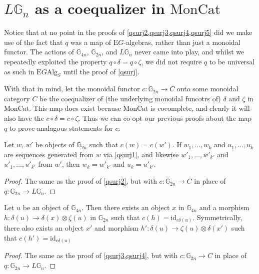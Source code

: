 \section{$L\mathbb{G}_n$ as a coequalizer in $\mathrm{MonCat}$}

Notice that at no point in the proofs of \cref{qsurj2,qsurj3,qsurj4,qsurj5} did we make use of the fact that $q$ was a map of $\mathrm{E}G$-algebras, rather than just a monoidal functor. The actions of $\mathbb{G}_{4n}$, $\mathbb{G}_{2n}$, and $L\mathbb{G}_n$ never came into play, and whilst we repeatedly exploited the property $q \circ \delta = q \circ \zeta$, we did not require $q$ to be universal as such in $\mathrm{E}G\mathrm{Alg}_S$ until the proof of \cref{qsurj}.

With that in mind, let the monoidal functor $c: \mathbb{G}_{2n} \to C$ onto some monoidal category $C$ be the coequalizer of (the underlying monoidal funcotrs of) $\delta$ and $\zeta$ in $\mathrm{MonCat}$. This map does exist because $\mathrm{MonCat}$ is cocomplete, and clearly it will also have the $c \circ \delta = c \circ \zeta$. Thus we can co-opt our previous proofs about the map $q$ to prove analagous statements for $c$.

\begin{prop} \label{csurj2} Let $w$, $w'$ be objects of $\mathbb{G}_{2n}$ such that $c(w) = c(w')$. If $w_1, ..., w_k$ and $u_1, ..., u_k$ are sequences generated from $w$ via \cref{qsurj1}, and likewise $w'_1, ..., w'_{k'}$ and $u'_1, ..., u'_{k'}$ from $w'$, then $w_k = w'_{k'}$ and $u_k = u'_{k'}$.
\end{prop}
\begin{proof}
The same as the proof of \cref{qsurj2}, but with $c: \mathbb{G}_{2n} \to C$ in place of $q: \mathbb{G}_{2n} \to L\mathbb{G}_n$.
\end{proof}

\begin{prop} \label{csurj34} Let $u$ be an object of $\mathbb{G}_{4n}$. Then there exists an object $x$ in $\mathbb{G}_{4n}$ and a morphism $h: \delta(u) \to \delta(x) \otimes \zeta(u)$ in $\mathbb{G}_{2n}$ such that $c(h) = \mathrm{id}_{c\delta(u)}$. Symmetrically, there also exists an object $x'$ and morphism $h': \delta(u) \to \zeta(u) \otimes \delta(x')$ such that $c(h') = \mathrm{id}_{c\delta(u)}$
\end{prop}
\begin{proof}
The same as the proof of \cref{qsurj3,qsurj4}, but with $c: \mathbb{G}_{2n} \to C$ in place of $q: \mathbb{G}_{2n} \to L\mathbb{G}_n$.
\end{proof}

